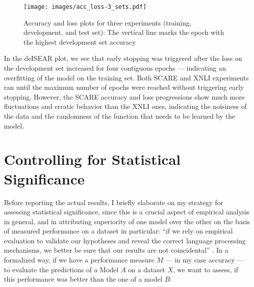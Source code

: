 \begin{figure}[H]
  \begin{center}
    \texttt{[image: images/acc\_loss-3\_sets.pdf]}
  \end{center}
  \caption[Accuracy/Loss plots of three experiments]{Accuracy and loss plots for three
experiments (\textcolor{std-blue}{training}, \textcolor{std-red}{development}, and
\textcolor{std-green}{test} set): The vertical line marks the epoch with the highest
development set accuracy}
  \label{fig:acc-loss}
\end{figure}

In the deISEAR plot, we see that early stopping
was triggered after the loss on the development set increased for four contiguous
epochs --- indicating an overfitting of the model on the training set. Both SCARE
and XNLI experiments ran until the maximum number of epochs were reached without
triggering early stopping. However, the SCARE accuracy and loss progressions show
much more fluctuations and erratic behavior than the XNLI ones, indicating the
noisiness of the data and the randomness of the function that needs to be learned
by the model.




\section{Controlling for Statistical Significance}

Before reporting the actual results, I briefly elaborate on my strategy for
assessing statistical significance, since this is a crucial aspect of empirical
analysis in general, and in attributing superiority of one model over the other
on the basis of measured performance on a dataset in particular:
``if we rely on empirical evaluation to validate our hypotheses and reveal the
correct language processing mechanisms, we better be sure that our results are
not coincidental'' \citep{dror2018hitchhiker}. In a formalized way, if we have a
performance measure $M$ --- in my case accuracy --- to evaluate the predictions
of a Model $A$ on a dataset $X$, we want to assess, if this performance was better
than the one of a model $B$:

